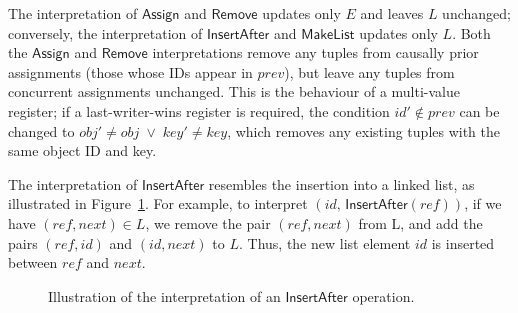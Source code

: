 The interpretation of $\mathsf{Assign}$ and $\mathsf{Remove}$ updates only $E$ and leaves $L$ unchanged; conversely, the interpretation of $\mathsf{InsertAfter}$ and $\mathsf{MakeList}$ updates only $L$.
Both the $\mathsf{Assign}$ and $\mathsf{Remove}$ interpretations remove any tuples from causally prior assignments (those whose IDs appear in $\mathit{prev}$), but leave any tuples from concurrent assignments unchanged.
This is the behaviour of a multi-value register; if a last-writer-wins register is required, the condition $\mathit{id}' \notin \mathit{prev}$ can be changed to $\mathit{obj}' \neq \mathit{obj} \;\vee\; \mathit{key}' \neq \mathit{key}$, which removes any existing tuples with the same object ID and key.

The interpretation of $\mathsf{InsertAfter}$ resembles the insertion into a linked list, as illustrated in Figure~\ref{fig:list-insert}.
For example, to interpret $(\mathit{id},\, \mathsf{InsertAfter}(\mathit{ref}))$, if we have $(\mathit{ref}, \mathit{next}) \in L$, we remove the pair $(\mathit{ref}, \mathit{next})$ from L, and add the pairs $(\mathit{ref}, \mathit{id})$ and $(\mathit{id}, \mathit{next})$ to $L$.
Thus, the new list element $\mathit{id}$ is inserted between $\mathit{ref}$ and $\mathit{next}$.

\begin{figure}
\centering
{}
\caption{Illustration of the interpretation of an $\mathsf{InsertAfter}$ operation.}\label{fig:list-insert}
\end{figure}

